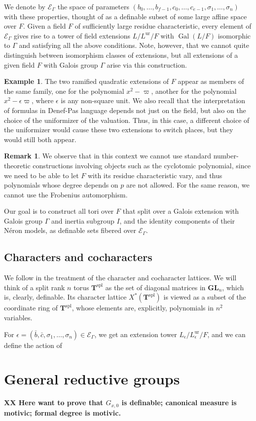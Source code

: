 \documentclass{amsart}
\newcommand{\GL}{\mathbf {GL}}
\newcommand{\gal}{\operatorname{Gal}}
\newcommand{\ur}{\mathrm{ur}}
\newcommand{\bT}{\mathbf {T}}
\newcommand\cE{{\mathcal E}}
\newcommand\spl{\mathrm{spl}}
\theoremstyle{plain}
\theoremstyle{definition}
\newtheorem{rem}[thm]{Remark}
\newtheorem{example}[thm]{Example}
\begin{document}
We denote by $\cE_\Gamma$ the space of parameters $(b_0, \dots, b_{f-1}, c_0, \dots, c_{e-1}, \sigma_1, \dots, \sigma_n)$ with these properties, thought of as a definable subset of some large affine space over $F$. 
Given a field $F$ of sufficiently large residue characteristic, every element of $\cE_\Gamma$ gives rise to a tower of field extensions $L/L^\ur/F$ with $\gal(L/F)$ isomorphic to $\Gamma$ and satisfying all the above conditions. Note, however, that we cannot quite distinguish between 
isomorphism classes of extensions, but all extensions of a given field $F$ with Galois group 
$\Gamma$ arise via this construction.   
\begin{example}
The two ramified quadratic extensions of $F$ appear as members of the same family, one for the 
polynomial $x^2-\varpi$, another for the polynomial $x^2-\epsilon\varpi$, where $\epsilon$  is any non-square unit. We also recall that the interpretation of formulas in Denef-Pas language depends not just on the field, but also on the choice of the uniformizer of the valuation. Thus, in this case, a different choice of the uniformizer would cause these two extensions to switch places, but they would still both appear. 
\end{example}
\begin{rem} We observe that in this context we cannot use standard number-theoretic constructions involving objects such as the cyclotomic polynomial, since we need to be able to let $F$ with its residue characteristic vary, and thus polynomials whose degree depends on $p$ are not allowed. For the same reason, we cannot use the Frobenius automorphism.  
\end{rem}
Our goal is to construct all tori over $F$ that split over a Galois extension with Galois group 
$\Gamma$ and inertia subgroup $I$, and the identity components of their N\'eron models, as 
definable sets fibered over $\cE_\Gamma$.  

\subsection{Characters and cocharacters}
We follow \cite{cluckers-hales-loeser} in the treatment of the character and cocharacter lattices.
We will think of a split rank $n$ torus ${\bT}^\spl$ as the set of diagonal matrices in $\GL_n$, which is, clearly, definable. Its character lattice $X^\ast({\bT}^\spl)$ is viewed as a subset of the coordinate ring of $\bT^\spl$, whose elements are, explicitly, polynomials in $n^2$ variables. 

For $\epsilon=(\bar b, \bar c, \sigma_1, \dots, \sigma_n)\in \cE_\Gamma$, we get an extension tower 
$L_\epsilon/L_\epsilon^\ur/F$, and we can define the action of  


\section{General reductive groups}
{\bf XX Here want to prove that $G_{x, 0}$ is definable; canonical measure is motivic; formal degree is motivic. }
\end{document}
